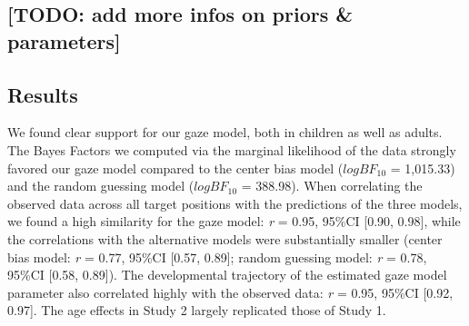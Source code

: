 \documentclass[
  man,mask,floatsintext]{apa6}
\begin{document}
\hypertarget{todo-add-more-infos-on-priors-parameters}{%
\subsection{{[}TODO: add more infos on priors \& parameters{]}}\label{todo-add-more-infos-on-priors-parameters}}

\hypertarget{results-1}{%
\subsection{Results}\label{results-1}}

We found clear support for our gaze model, both in children as well as adults. The Bayes Factors we computed via the marginal likelihood of the data strongly favored our gaze model compared to the center bias model (\(logBF_{10}\) = 1,015.33) and the random guessing model (\(logBF_{10}\) = 388.98).
When correlating the observed data across all target positions with the predictions of the three models, we found a high similarity for the gaze model: \emph{r} = 0.95, 95\%CI {[}0.90, 0.98{]}, while the correlations with the alternative models were substantially smaller (center bias model: \emph{r} = 0.77, 95\%CI {[}0.57, 0.89{]}; random guessing model: \emph{r} = 0.78, 95\%CI {[}0.58, 0.89{]}). The developmental trajectory of the estimated gaze model parameter also correlated highly with the observed data: \emph{r} = 0.95, 95\%CI {[}0.92, 0.97{]}. The age effects in Study 2 largely replicated those of Study 1.
\end{document}
